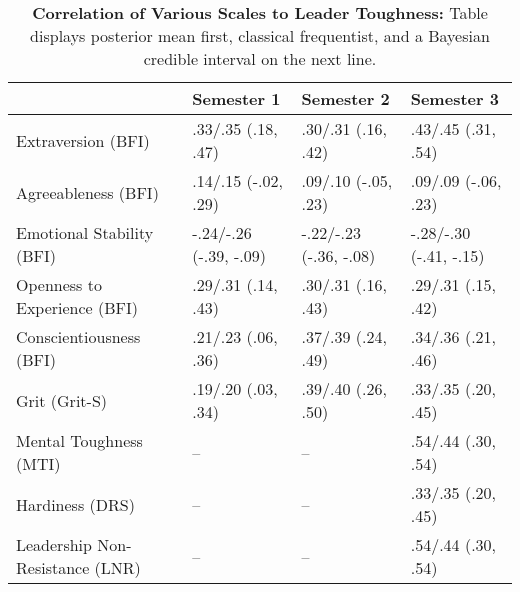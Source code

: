 \begin{table}[ht]
\centering
\begin{tabular}{llll}
  \hline
 & Semester 1 & Semester 2 & Semester 3 \\ 
  \hline
Extraversion (BFI) & .33/.35 (.18, .47) & .30/.31 (.16, .42) & .43/.45 (.31, .54) \\ 
  Agreeableness (BFI) & .14/.15 (-.02, .29) & .09/.10 (-.05, .23) & .09/.09 (-.06, .23) \\ 
  Emotional Stability (BFI) & -.24/-.26 (-.39, -.09) & -.22/-.23 (-.36, -.08) & -.28/-.30 (-.41, -.15) \\ 
  Openness to Experience (BFI) & .29/.31 (.14, .43) & .30/.31 (.16, .43) & .29/.31 (.15, .42) \\ 
  Conscientiousness (BFI) & .21/.23 (.06, .36) & .37/.39 (.24, .49) & .34/.36 (.21, .46) \\ 
  Grit (Grit-S) & .19/.20 (.03, .34) & .39/.40 (.26, .50) & .33/.35 (.20, .45) \\ 
  Mental Toughness (MTI) & -- & -- & .54/.44 (.30, .54) \\ 
  Hardiness (DRS) & -- & -- & .33/.35 (.20, .45) \\ 
  Leadership Non-Resistance (LNR) & -- & -- & .54/.44 (.30, .54) \\ 
   \hline
\end{tabular}
\caption{\textbf{Correlation of Various Scales to Leader Toughness:} Table displays posterior mean first, classical frequentist, and a Bayesian credible interval on the next line.} 
\label{tab:pers_corr}
\end{table}
